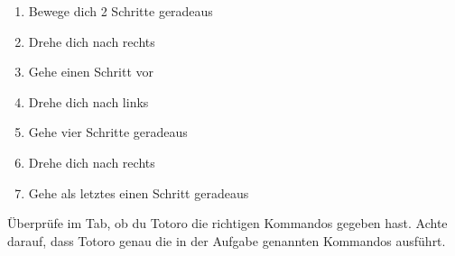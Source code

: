 \begin{enumerate}
        {
\begin{enumerate}
\item Bewege dich 2 Schritte geradeaus
\item Drehe dich nach rechts
\item Gehe einen Schritt vor
\item Drehe dich nach links
\item Gehe vier Schritte geradeaus
\item Drehe dich nach rechts
\item Gehe als letztes einen Schritt geradeaus
\end{enumerate}
}

Überprüfe im  Tab, ob du Totoro die richtigen Kommandos gegeben hast. 
Achte darauf, dass Totoro genau die in der Aufgabe genannten Kommandos ausführt.
\end{enumerate}

